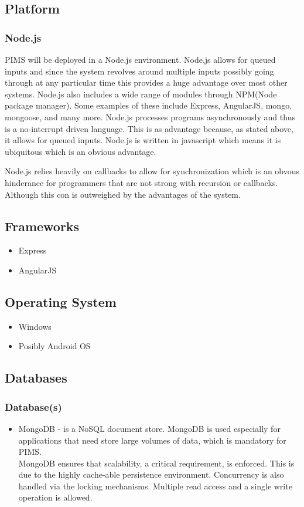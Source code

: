 \subsection{Platform}
\subsubsection{Node.js}
PIMS will be deployed in a Node.js environment. Node.js allows for queued inputs and since the system revolves around multiple inputs possibly going through at any particular time this provides a huge advantage over most other systems. Node.js also includes a wide range of modules through NPM(Node package manager). Some examples of these include Express, AngularJS, mongo, mongoose, and many more. Node.js processes programs asynchronously and thus is a no-interrupt driven language. This is as advantage because, as stated above, it allows for queued inputs. Node.js is written in javascript which means it is ubiquitous which is an obvious advantage.

Node.js relies heavily on callbacks to allow for synchronization which is an obvous hinderance for programmers that are not strong with recursion or callbacks. Although this con is outweighed by the advantages of the system.


\subsection{Frameworks}
\begin{itemize}
		\item Express
		\item AngularJS
\end{itemize}

\subsection{Operating System}
\begin{itemize}
		\item Windows
		\item Posibly Android OS
\end{itemize}
	
	
\subsection{Databases}
\subsubsection{Database(s)}
\begin{itemize}
	\item MongoDB - is a NoSQL document store. MongoDB is used especially for applications that need store large volumes of data, which is mandatory for PIMS. \\
	MongoDB ensures that scalability, a critical requirement, is enforced. This is due to the highly cache-able persistence environment. Concurrency is also handled  via the locking mechanisms. Multiple read access and a single write operation is allowed.
\end{itemize}
	


